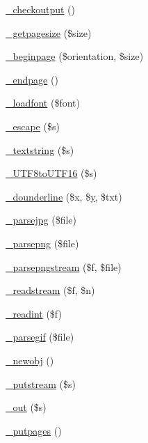 \begin{DoxyCompactItemize}
\hyperlink{class_f_p_d_f_aae8f75d4fcd8774b6663c378cf2a32e4}{\-\_\-checkoutput} ()
\item 
\hyperlink{class_f_p_d_f_aca25fc93dd33864413e1bfb8665ccc2a}{\-\_\-getpagesize} (\$size)
\item 
\hyperlink{class_f_p_d_f_ac1ce0e0dd9cad852a78b4df4db4db3d6}{\-\_\-beginpage} (\$orientation, \$size)
\item 
\hyperlink{class_f_p_d_f_a0c727a46d970b65e123da12e3cb34b58}{\-\_\-endpage} ()
\item 
\hyperlink{class_f_p_d_f_a17b92aa9a0bf565520693a801edab6aa}{\-\_\-loadfont} (\$font)
\item 
\hyperlink{class_f_p_d_f_a315a57aaf556052008dd99ff196b812e}{\-\_\-escape} (\$s)
\item 
\hyperlink{class_f_p_d_f_a7a9f870d2548f450a8bc90f59b96656d}{\-\_\-textstring} (\$s)
\item 
\hyperlink{class_f_p_d_f_ae0d452fb23ac5d8bf11c17fbb96824ac}{\-\_\-\-U\-T\-F8to\-U\-T\-F16} (\$s)
\item 
\hyperlink{class_f_p_d_f_a35c042a9f396daa571e91a16ea65edc4}{\-\_\-dounderline} (\$x, \$\hyperlink{example43___m_p_d_f_i__booklet_8php_a3f83be162d14f38451e1bc419fbbbcbc}{y}, \$txt)
\item 
\hyperlink{class_f_p_d_f_aa0f75e695bf426888c0dc7d3a9635e22}{\-\_\-parsejpg} (\$file)
\item 
\hyperlink{class_f_p_d_f_a5d9bff475aeba54667a4dbc058b1517b}{\-\_\-parsepng} (\$file)
\item 
\hyperlink{class_f_p_d_f_a2fa338357dd39cbbaa69c8a1d811745e}{\-\_\-parsepngstream} (\$f, \$file)
\item 
\hyperlink{class_f_p_d_f_abdc4f5232eab0e2bfc86570c07d44688}{\-\_\-readstream} (\$f, \$n)
\item 
\hyperlink{class_f_p_d_f_a0d76d528045f895215a9bc0c16c8aad5}{\-\_\-readint} (\$f)
\item 
\hyperlink{class_f_p_d_f_a3c95d5d6ce5651c4cf53cd88e82982b8}{\-\_\-parsegif} (\$file)
\item 
\hyperlink{class_f_p_d_f_adf8bee44dbc72dd22396e57e1dd955d8}{\-\_\-newobj} ()
\item 
\hyperlink{class_f_p_d_f_a7ce4eca35f608d38161ab60809cdd0cf}{\-\_\-putstream} (\$s)
\item 
\hyperlink{class_f_p_d_f_a01f1638c57a38691668dbf5a7bdf9852}{\-\_\-out} (\$s)
\item 
\hyperlink{class_f_p_d_f_a01951b3fad634e87f5ab6763d6444476}{\-\_\-putpages} ()
\item 

\end{DoxyCompactItemize}
